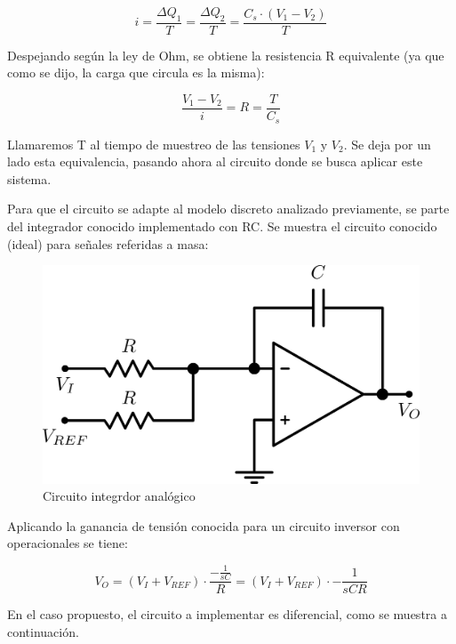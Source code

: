 \documentclass[assd_tp3_main.tex]{subfiles}
\begin{document}
\[
i = \frac{\Delta Q_1}{T} = \frac{\Delta Q_2}{T} = \frac{C_s \cdot (V_1 - V_2)}{T}
\]

Despejando según la ley de Ohm, se obtiene la resistencia R equivalente (ya que como se dijo, la carga que circula es la misma):

\[
\frac{V_1 - V_2}{i} = R = \frac{T}{C_s}
\]

Llamaremos T al tiempo de muestreo de las tensiones $V_1$ y $V_2$. Se deja por un lado esta equivalencia, pasando ahora al circuito donde se busca aplicar este sistema.\par 
Para que el circuito se adapte al modelo discreto analizado previamente, se parte del integrador conocido implementado con RC. Se muestra el circuito conocido (ideal) para señales referidas a masa:

\begin{figure}[!ht]
\begin{centering}
\includegraphics[scale=0.5]{images/ej5/IntegradorBasico.png}
\par\end{centering}
\caption{Circuito integrdor analógico}
\end{figure}


Aplicando la ganancia de tensión conocida para un circuito inversor con operacionales se tiene:

\[
V_O = (V_I+V_{REF}) \cdot \frac{-\frac{1}{sC}}{R} = (V_I + V_{REF}) \cdot -\frac{1}{sCR}
\]

En el caso propuesto, el circuito a implementar es diferencial, como se muestra a continuación.
\end{document}
